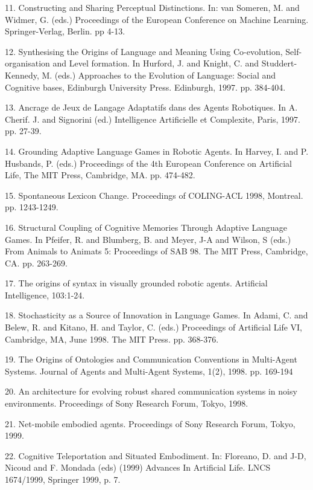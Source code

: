11. \citet{Steels:97e} Constructing and Sharing Perceptual Distinctions. In: van Someren, M. and Widmer, G. (eds.) Proceedings of the European Conference on Machine Learning. Springer-Verlag, Berlin. pp 4-13. 

12. \citet{Steels:97f} Synthesising the Origins of Language and Meaning Using Co-evolution, Self-organisation and Level formation. In Hurford, J. and Knight, C. and Studdert-Kennedy, M. (eds.) Approaches to the Evolution of Language: Social and Cognitive bases, Edinburgh University Press. Edinburgh, 1997. pp. 384-404. 

13. \citet{Steels:97g} Ancrage de Jeux de Langage Adaptatifs dans des Agents Robotiques. In A. Cherif. J. and Signorini (ed.) Intelligence Artificielle et Complexite, Paris, 1997. pp. 27-39. 

14. \citet{Steels:97h} Grounding Adaptive Language Games in Robotic Agents. In Harvey, I. and P. Husbands, P. (eds.) Proceedings of the 4th European Conference on Artificial Life, The MIT Press, Cambridge, MA. pp. 474-482.

15. \citet{Steels:98a} Spontaneous Lexicon Change. Proceedings of COLING-ACL 1998, Montreal. pp. 1243-1249. 

16. \citet{Steels:98b} Structural Coupling of Cognitive Memories Through Adaptive Language Games. In Pfeifer, R. and Blumberg, B. and Meyer, J-A and Wilson, S (eds.) From Animals to Animats 5: Proceedings of SAB 98. The MIT Press, Cambridge, CA. pp. 263-269. 

17. \citet{Steels:98c} The origins of syntax in visually grounded robotic agents. Artificial Intelligence, 103:1-24. 

18. \citet{Steels:98d} Stochasticity as a Source of Innovation in Language Games. In Adami, C. and Belew, R. and Kitano, H. and Taylor, C. (eds.) Proceedings of Artificial Life VI, Cambridge, MA, June 1998. The MIT Press. pp. 368-376. 

19. \citet{Steels:98e} The Origins of Ontologies and Communication Conventions in Multi-Agent Systems. Journal of Agents and Multi-Agent Systems, 1(2), 1998. pp. 169-194

20. \citet{Kaplan:98f} An architecture for evolving robust shared communication systems in noisy environments. Proceedings of Sony Research Forum, Tokyo, 1998.

21. \citet{mcintyre:99a} Net-mobile embodied agents. Proceedings of Sony Research Forum, Tokyo, 1999.

22. \citet{Steels:99b} Cognitive Teleportation and Situated Embodiment. In: Floreano, D. and J-D, Nicoud and F. 
Mondada (eds) (1999) Advances In Artificial Life. LNCS 1674/1999, Springer 1999, p. 7. 

